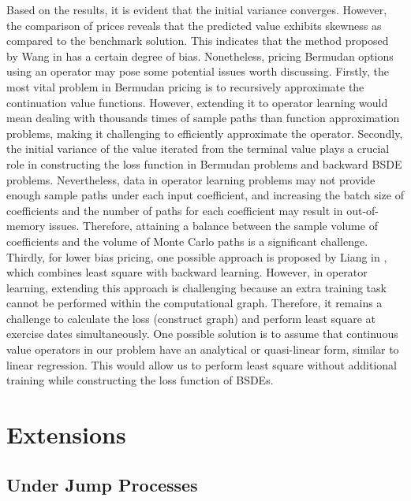 \documentclass[11pt,a4paper]{article}
\theoremstyle{remark}
\begin{document}
	Based on the results, it is evident that the initial variance converges. However, the comparison of prices reveals that the predicted value exhibits skewness as compared to the benchmark solution. This indicates that the method proposed by Wang in \cite{wang2018deep} has a certain degree of bias. Nonetheless, pricing Bermudan options using an operator may pose some potential issues worth discussing. Firstly, the most vital problem in Bermudan pricing is to recursively approximate the continuation value functions. However, extending it to operator learning would mean dealing with thousands times of sample paths than function approximation problems, making it challenging to efficiently approximate the operator. Secondly, the initial variance of the value iterated from the terminal value plays a crucial role in constructing the loss function in Bermudan problems and backward BSDE problems. Nevertheless, data in operator learning problems may not provide enough sample paths under each input coefficient, and increasing the batch size of coefficients and the number of paths for each coefficient may result in out-of-memory issues. Therefore, attaining a balance between the sample volume of coefficients and the volume of Monte Carlo paths is a significant challenge. Thirdly, for lower bias pricing, one possible approach is proposed by Liang in \cite{liang2021deep}, which combines least square with backward learning. However, in operator learning, extending this approach is challenging because an extra training task cannot be performed within the computational graph. Therefore, it remains a challenge to calculate the loss (construct graph) and perform least square at exercise dates simultaneously. One possible solution is to assume that continuous value operators in our problem have an analytical or quasi-linear form, similar to linear regression. This would allow us to perform least square without additional training while constructing the loss function of BSDEs. 
	\fi
	
	
	
	\section{Extensions}
	\subsection{Under Jump Processes}
\end{document}
